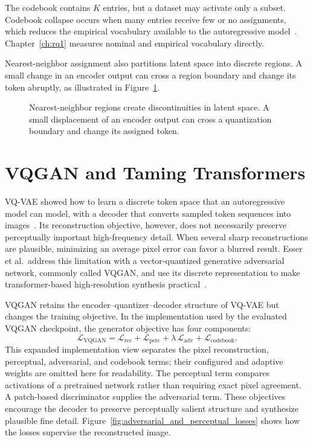 The codebook contains $K$ entries, but a dataset may activate only a subset.
Codebook collapse occurs when many entries receive few or no assignments, which
reduces the empirical vocabulary available to the autoregressive
model~\cite{lancucki2020robust,yu2021vector,mentzer2023finite}. Chapter~\ref{ch:rq1}
measures nominal and empirical vocabulary directly.

Nearest-neighbor assignment also partitions latent space into discrete regions.
A small change in an encoder output can cross a region boundary and change its
token abruptly, as illustrated in Figure~\ref{fig:vq_boundary_crossing}.

\begin{figure}[t]
    \centering
    \resizebox{0.9\textwidth}{!}{}
    \caption{Nearest-neighbor regions create discontinuities in latent space. A small displacement of an encoder output can cross a quantization boundary and change its assigned token.}
    \label{fig:vq_boundary_crossing}
\end{figure}

\section{VQGAN and Taming Transformers}
\label{sec:vqgan_taming}

VQ-VAE showed how to learn a discrete token space that an autoregressive model
can model, with a decoder that converts sampled token sequences into
images~\cite{oord2017neural}. Its reconstruction objective, however, does not
necessarily preserve perceptually important high-frequency detail. When several
sharp reconstructions are plausible, minimizing an average pixel error can
favor a blurred result. Esser et al.\ address this limitation with a
vector-quantized generative adversarial network, commonly called VQGAN, and use
its discrete representation to make transformer-based high-resolution
synthesis practical~\cite{esser2021taming}.

VQGAN retains the encoder--quantizer--decoder structure of VQ-VAE but changes
the training objective. In the implementation used by the evaluated VQGAN
checkpoint, the generator objective has four components:
\begin{equation}
    \mathcal{L}_{\mathrm{VQGAN}}
    =
    \mathcal{L}_{\mathrm{rec}}
    + \mathcal{L}_{\mathrm{perc}}
    + \lambda\,\mathcal{L}_{\mathrm{adv}}
    + \mathcal{L}_{\mathrm{codebook}}.
\end{equation}
This expanded implementation view separates the pixel reconstruction,
perceptual, adversarial, and codebook terms; their configured and adaptive
weights are omitted here for readability. The perceptual term compares
activations of a pretrained network rather than requiring exact pixel
agreement. A patch-based discriminator supplies the adversarial term. These
objectives encourage the decoder to preserve perceptually salient structure and
synthesize plausible fine detail. Figure~\ref{fig:adversarial_and_perceptual_losses}
shows how the losses supervise the reconstructed image.


